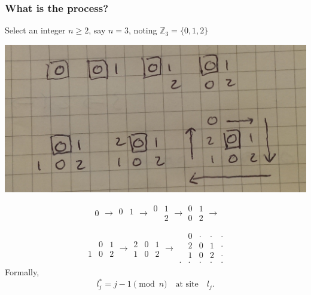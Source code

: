 \documentclass{beamer}
\theoremstyle{mydef}
\begin{document}
\frame
{
  \frametitle{What is the process?}
  Select an integer $n \ge 2$, say $n = 3$, noting $\mathbb{Z}_3 = \{ 0, 1, 2\}$
  \begin{center}
  \includegraphics[scale=.1]{images/mod3move.png}
  \end{center}
\tiny
\[  \begin{array}{c}
\boxed{0}
\end{array} 
\rightarrow
%
\begin{array}{cc}
\boxed{0} & 1 \\
\  & \ 
\end{array}
\rightarrow
\begin{array}{cc}
\boxed{0} & 1 \\
\  & 2
\end{array}
\rightarrow
\begin{array}{cc}
\boxed{0} & 1 \\
0 & 2
\end{array}
\rightarrow
\]

\[
\begin{array}{ccc}
\  & \boxed{0} & 1 \\
1 & 0 & 2
\end{array}
\rightarrow
\begin{array}{ccc}
2 & \boxed{0} & 1 \\
1 & 0 & 2
\end{array}
\rightarrow
\begin{array}{ccccc}
\  & 0 & \cdot  & \cdot & \cdot \\
\  & 2 & \boxed{0} & 1 & \cdot \\
\  & 1 & 0 & 2 & \cdot \\
\cdot & \cdot & \cdot & \cdot & \cdot
\end{array}
\]
Formally,
\[
  l_j^* = j-1 \!\!\!\pmod n \quad\text{at site}\quad l_j.
\]

}
\end{document}
